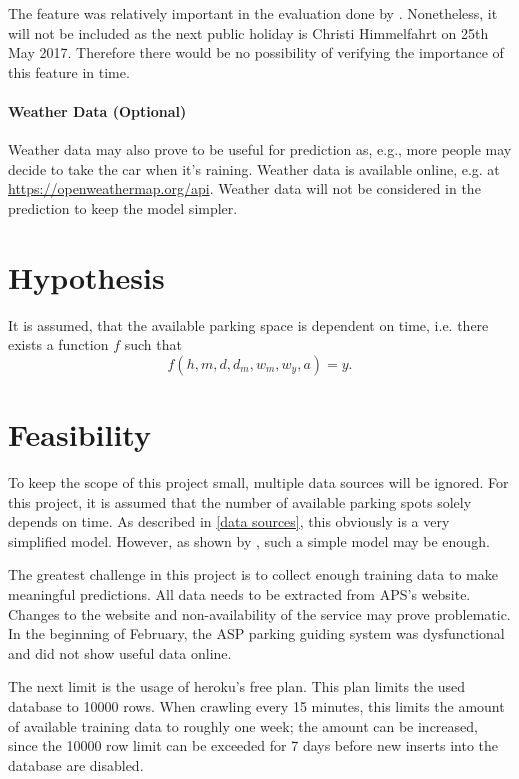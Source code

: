\documentclass[journal,10pt]{IEEEtran}
\newcommand{\hod}{h}
\newcommand{\moh}{m}
\newcommand{\dow}{d}
\newcommand{\dom}{d_m}
\newcommand{\wom}{w_m}
\newcommand{\woy}{w_y}
\newcommand{\yyy}{a}
\begin{document}
The feature was relatively important in the evaluation done by \cite{parkendd}. Nonetheless, it will not be included as the next public holiday is Christi Himmelfahrt on 25th May 2017. Therefore there would be no possibility of verifying the importance of this feature in time.

\paragraph{Weather Data (Optional)}

Weather data may also prove to be useful for prediction as, e.g., more people may decide to take the car when it's raining. Weather data is available online, e.g. at \url{https://openweathermap.org/api}. Weather data will not be considered in the prediction to keep the model simpler.


\section{Hypothesis}

It is assumed, that the available parking space is dependent on time, i.e. there exists a function \(f\) such that 
\[
f(\hod, \moh, \dow, \dom, \wom, \woy, \yyy) = y\text{.}
\]



\section{Feasibility}

To keep the scope of this project small, multiple data sources will be ignored. For this project, it is assumed that the number of available parking spots solely depends on time. As described in \ref{data sources}, this obviously is a very simplified model. However, as shown by \cite{parkendd}, such a simple model may be enough. 

The greatest challenge in this project is to collect enough training data to make meaningful predictions. All data needs to be extracted from APS's website. Changes to the website and non-availability of the service may prove problematic. In the beginning of February, the ASP parking guiding system was dysfunctional and did not show useful data online. 

The next limit is the usage of heroku's free plan. This plan limits the used database to 10000 rows. When crawling every 15 minutes, this limits the amount of available training data to roughly one week; the amount can be increased, since the 10000 row limit can be exceeded for 7 days before new inserts into the database are disabled.
\end{document}
